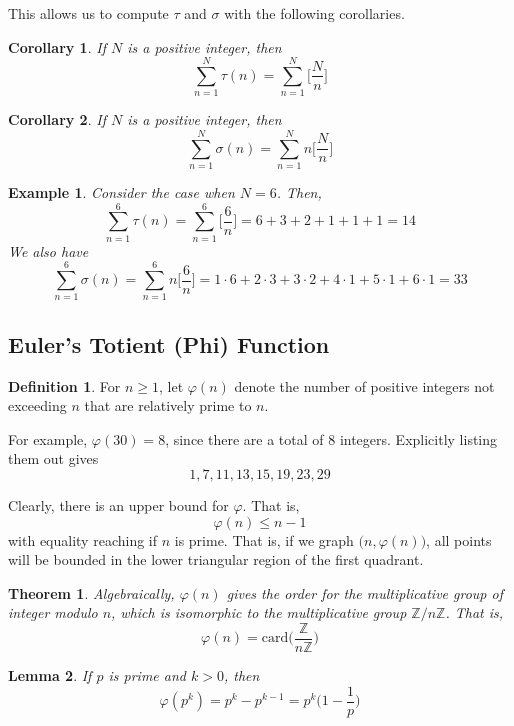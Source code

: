\documentclass{article}
\newtheorem{theorem}{Theorem}[section]
\newtheorem{lemma}[theorem]{Lemma}
\newtheorem{example}{Example}[section]
\newtheorem{corollary}{Corollary}[theorem]
\theoremstyle{remark}
\theoremstyle{definition}
\newtheorem{definition}{Definition}[section]
\begin{document}
This allows us to compute $\tau$ and $\sigma$ with the following corollaries. 

\begin{corollary}
If $N$ is a positive integer, then
\[\sum_{n=1}^N \tau(n) = \sum_{n=1}^N \bigg[ \frac{N}{n} \bigg]\]
\end{corollary}

\begin{corollary}
If $N$ is a positive integer, then
\[\sum_{n=1}^N \sigma(n) = \sum_{n=1}^N n \bigg[ \frac{N}{n} \bigg]\]
\end{corollary}

\begin{example}
Consider the case when $N = 6$. Then, 
\[\sum_{n=1}^6 \tau(n) = \sum_{n=1}^6 \bigg[ \frac{6}{n} \bigg] = 6 + 3 + 2 + 1 + 1 + 1 = 14\]
We also have 
\[\sum_{n=1}^6 \sigma(n) = \sum_{n=1}^6 n \bigg[ \frac{6}{n} \bigg] = 1 \cdot 6 + 2 \cdot 3 + 3 \cdot 2 + 4 \cdot 1 + 5 \cdot 1 + 6 \cdot 1 = 33\]
\end{example}

\subsection{Euler's Totient (Phi) Function}
\begin{definition}
For $n \geq 1$, let $\varphi(n)$ denote the number of positive integers not exceeding $n$ that are relatively prime to $n$. 
\end{definition}

For example, $\varphi(30) = 8$, since there are a total of $8$ integers. Explicitly listing them out gives 
\[1, 7, 11, 13, 15, 19, 23, 29\]

Clearly, there is an upper bound for $\varphi$. That is, 
\[\varphi(n) \leq n-1\]
with equality reaching if $n$ is prime. That is, if we graph $\big(n, \varphi(n)\big)$, all points will be bounded in the lower triangular region of the first quadrant. 

\begin{theorem}
Algebraically, $\varphi(n)$ gives the order for the multiplicative group of integer modulo $n$, which is isomorphic to the multiplicative group $\mathbb{Z} / n \mathbb{Z}$. That is, 
\[\varphi(n) = \text{card} \bigg( \frac{\mathbb{Z}}{n \mathbb{Z}} \bigg)\]
\end{theorem}

\begin{lemma}
If $p$ is prime and $k>0$, then 
\[\varphi(p^k) = p^k - p^{k-1} = p^k \bigg(1 - \frac{1}{p} \bigg)\]
\end{lemma}
\end{document}
